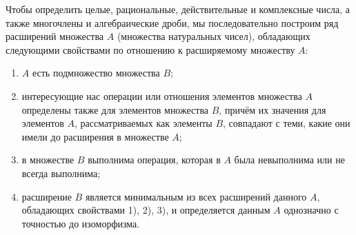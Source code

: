 \begin{rusblock}
Чтобы определить целые, рациональные, действительные и комплексные числа, а также многочлены и алгебраические дроби, мы последовательно построим ряд расширений множества $A$ (множества натуральных чисел), обладающих следующими свойствами по отношению к расширяемому множеству $A$:
\begin{enumerate}[leftmargin=2.2em]
\item $A$ есть подмножество множества $B$;
\item интересующие нас операции или отношения элементов множества $A$ определены также для элементов множества $B$, причём их значения для элементов $A$, рассматриваемых как элементы $B$, совпадают с теми, какие они имели до расширения в множестве $A$;
\item в множестве $B$ выполнима операция, которая в $A$ была невыполнима или не всегда выполнима;
\item расширение $B$ является минимальным из всех расширений данного $A$, обладающих свойствами 1), 2), 3), и определяется данным $A$ однозначно с точностью до изоморфизма.
\end{enumerate}
\end{rusblock}

